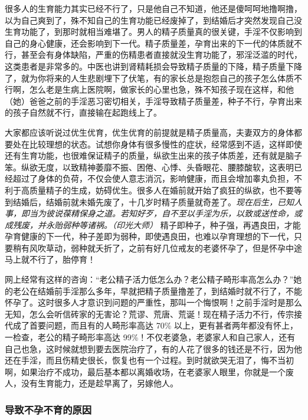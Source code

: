 很多人的生育能力其实已经不行了，只是他自己不知道，他还是傻呵呵地撸啊撸，以为自己爽到了，殊不知自己的生育功能已经废掉了，到结婚后才突然发现自己没生育功能了，到那时就相当难堪了。男人的精子质量真的很关键，手淫不仅影响到自己的身心健康，还会影响到下一代。精子质量差，孕育出来的下一代的体质就不行，甚至会有身体缺陷，严重的伤精患者直接就没生育功能了，邪淫泛滥的时代，这类患者是非常多的。中医也讲到肾精耗损会导致精子质量的下降，精子质量下降了，就为你将来的人生悲剧埋下了伏笔，有的家长总是抱怨自己的孩子怎么体质不行啊，怎么老是生病上医院啊，做家长的心里也急，殊不知孩子现在这样，和他（她）爸爸之前的手淫恶习密切相关，手淫导致精子质量差，种子不行，孕育出来的孩子自然就不行，直接输在起跑线上了。

大家都应该听说过优生优育，优生优育的前提就是精子质量高，夫妻双方的身体都要处在比较理想的状态。试想你身体有很多慢性的症状，经常感到不适，这样即使还有生育功能，也很难保证精子的质量，纵欲生出来的孩子体质差，还有就是脑子笨。纵欲无度，以致精神萎靡不振、困倦、心悸、头昏眼花、腰膝酸软，这表明已经超过了身体的负荷，不仅会使人意志消沉，影响健康，而且会增加睾丸负担，不利于高质量精子的生成，妨碍优生。很多人在婚前就开始了疯狂的纵欲，也不要等到结婚后，结婚前就未婚先废了，十几岁时精子质量就奇差了。\textit{现在后生，已知人事，即当为彼说葆精保身之道。若知好歹，自不至以手淫为乐，以致或送性命，或成残废，并永贻弱种等诸祸。（印光大师）} 精子即种子，种子强，再遇良田，才能孕育健康的下一代，种子差即为弱种，即使遇良田，也难以孕育理想的下一代，只要稍有风吹草动，弱种就夭折了，之前有好几位戒友的老婆怀孕了，但是怀孕中途马上就不行了，胎停育！

网上经常有这样的咨询：“老公精子活力低怎么办？老公精子畸形率高怎么办？”她的老公在结婚前手淫那么多年，早就把精子质量撸差了，到结婚时就不行了，不能怀孕了。这时很多人才意识到问题的严重性，那叫一个悔恨啊！之前手淫时是那么无知，怎么会听信砖家的无害论？荒谬、荒唐、荒诞！现在精子活力不行，传宗接代成了首要问题，而且有的人畸形率高达 70\% 以上，更有甚者两年都没有怀上，一检查，老公的精子畸形率高达 99\%！不仅老婆急，老婆家人和自己家人，还有自己也急，这时候就想到要去医院治疗了，有的人花了很多的钱还是不行，因为他还在手淫，而且伤精史很长，恢复也有一个过程。到时就欲哭无泪了，悔不当初啊，如果治疗不成功，最后基本都以离婚收场，在老婆家人眼里，你就是一个废人，没有生育能力，还是趁早离了，另嫁他人。

\subsubsection{导致不孕不育的原因}

